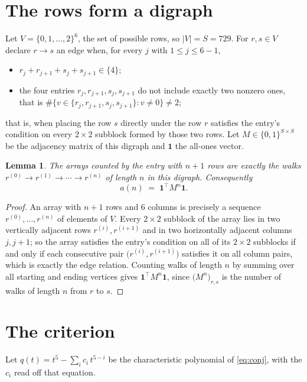 \documentclass[11pt,a4paper]{article}
\theoremstyle{plain}
\newtheorem{lemma}[theorem]{Lemma}
\theoremstyle{definition}
\begin{document}
\section{The rows form a digraph}

Let $V=\{0,1,\dots,2\}^{6}$, the set of possible rows, so $|V|=S=729$. For
$r,s\in V$ declare $r\to s$ an edge when, for every $j$ with $1\le j\le 6-1$,
\begin{itemize}
\item $r_j+r_{j+1}+s_j+s_{j+1}\in\{4\}$;
\item the four entries $r_j,r_{j+1},s_j,s_{j+1}$ do not include exactly two nonzero ones, that is $\#\bigl\{v\in\{r_j,r_{j+1},s_j,s_{j+1}\}: v\ne0\bigr\}\ne2$;
\end{itemize}
that is, when placing the row $s$ directly under the row $r$ satisfies the entry's
condition on every $2\times2$ subblock formed by those two rows. Let $M\in\{0,1\}^{S\times
S}$ be the adjacency matrix of this digraph and $\mathbf{1}$ the all-ones vector.

\begin{lemma}\label{lem:walk}
The arrays counted by the entry with $n+1$ rows are exactly the walks
$r^{(0)}\to r^{(1)}\to\cdots\to r^{(n)}$ of length $n$ in this digraph. Consequently
\[
a(n)\;=\;\mathbf{1}^{\!\top}M^{n}\mathbf{1} .
\]
\end{lemma}

\begin{proof}
An array with $n+1$ rows and $6$ columns is precisely a sequence
$r^{(0)},\dots,r^{(n)}$ of elements of $V$. Every $2\times2$ subblock of the array lies
in two vertically adjacent rows $r^{(i)},r^{(i+1)}$ and in two horizontally adjacent
columns $j,j+1$; so the array satisfies the entry's condition on all of its $2\times2$
subblocks if and only if each consecutive pair $\bigl(r^{(i)},r^{(i+1)}\bigr)$ satisfies
it on all column pairs, which is exactly the edge relation. Counting walks of length $n$ by
summing over all starting and ending vertices gives
$\mathbf{1}^{\!\top}M^{n}\mathbf{1}$, since
$\bigl(M^{n}\bigr)_{r,s}$ is the number of walks of length $n$ from $r$ to $s$.
\end{proof}

\section{The criterion}

Let $q(t)=t^{5}-\sum_{i}c_i\,t^{5-i}$ be the characteristic polynomial of
\eqref{eq:conj}, with the $c_i$ read off that equation.
\end{document}

